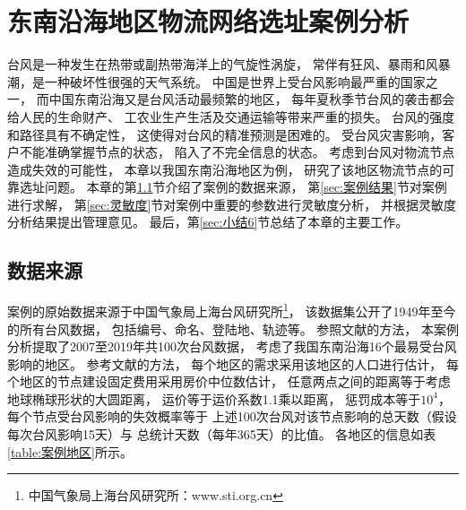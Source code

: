 \setlength{\baselineskip}{20pt}
\setlength{\tabcolsep}{5pt}
\chapter{东南沿海地区物流网络选址案例分析}
\label{cha:案例分析章}
台风是一种发生在热带或副热带海洋上的气旋性涡旋，
常伴有狂风、暴雨和风暴潮，是一种破坏性很强的天气系统\cite{台风2}。
中国是世界上受台风影响最严重的国家之一，
而中国东南沿海又是台风活动最频繁的地区，
每年夏秋季节台风的袭击都会给人民的生命财产、
工农业生产生活及交通运输等带来严重的损失\cite{台风}。
台风的强度和路径具有不确定性，
这使得对台风的精准预测是困难的。
受台风灾害影响，客户不能准确掌握节点的状态，
陷入了不完全信息的状态。
考虑到台风对物流节点造成失效的可能性，
本章以我国东南沿海地区为例，
研究了该地区物流节点的可靠选址问题。
本章的第\ref{sec:数据来源}节介绍了案例的数据来源，
第\ref{sec:案例结果}节对案例进行求解，
第\ref{sec:灵敏度}节对案例中重要的参数进行灵敏度分析，
并根据灵敏度分析结果提出管理意见。
最后，第\ref{sec:小结6}节总结了本章的主要工作。

\section{数据来源}
\label{sec:数据来源}
案例的原始数据来源于中国气象局上海台风研究所\footnote{中国气象局上海台风研究所：www.sti.org.cn}，
该数据集公开了1949年至今的所有台风数据，
包括编号、命名、登陆地、轨迹等。
参照文献\cite{Yongzhen}的方法，
本案例分析提取了2007至2019年共100次台风数据，
考虑了我国东南沿海16个最易受台风影响的地区。
参考文献\cite{Snyder2005,Yongzhen,yun2015}的方法，
每个地区的需求采用该地区的人口进行估计，
每个地区的节点建设固定费用采用房价中位数估计，
任意两点之间的距离等于考虑地球椭球形状的大圆距离，
运价等于运价系数1.1乘以距离，
惩罚成本等于$10^4$，
每个节点受台风影响的失效概率等于
上述100次台风对该节点影响的总天数（假设每次台风影响15天）与
总统计天数（每年365天）的比值。
各地区的信息如表\ref{table:案例地区}所示。


